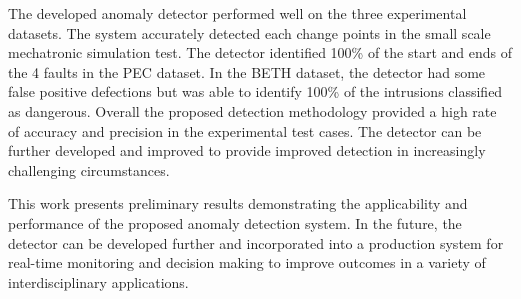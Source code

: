 The developed anomaly detector performed well on the three experimental datasets. The system accurately detected each change points in the small scale mechatronic simulation test. The detector identified 100\% of the start and ends of the 4 faults in the PEC dataset. In the BETH dataset, the detector had some false positive defections but was able to identify 100\% of the intrusions classified as dangerous. Overall the proposed detection methodology provided a high rate of accuracy and precision in the experimental test cases. The detector can be further developed and improved to provide improved detection in increasingly challenging circumstances.

This work presents preliminary results demonstrating the applicability and performance of the proposed anomaly detection system. In the future, the detector can be developed further and incorporated into a production system for real-time monitoring and decision making to improve outcomes in a variety of interdisciplinary applications. 

